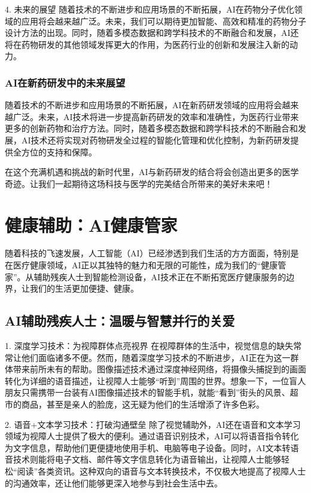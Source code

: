 4. 未来的展望
随着技术的不断进步和应用场景的不断拓展，AI在药物分子优化领域的应用将会越来越广泛。未来，我们可以期待更加智能、高效和精准的药物分子设计方法的出现。同时，随着多模态数据和跨学科技术的不断融合和发展，AI还将在药物研发的其他领域发挥更大的作用，为医药行业的创新和发展注入新的动力。

\subsubsection{AI在新药研发中的未来展望}
随着技术的不断进步和应用场景的不断拓展，AI在新药研发领域的应用将会越来越广泛。未来，AI技术将进一步提高新药研发的效率和准确性，为医药行业带来更多的创新药物和治疗方法。同时，随着多模态数据和跨学科技术的不断融合和发展，AI技术还将实现对药物研发全过程的智能化管理和优化控制，为新药研发提供全方位的支持和保障。

在这个充满机遇和挑战的新时代里，AI与新药研发的结合将会创造出更多的医学奇迹。让我们一起期待这场科技与医学的完美结合所带来的美好未来吧！

\section{健康辅助：AI健康管家}
随着科技的飞速发展，人工智能（AI）已经渗透到我们生活的方方面面，特别是在医疗健康领域，AI正以其独特的魅力和无限的可能性，成为我们的“健康管家”。从辅助残疾人士到智能检测设备，AI技术正在不断拓宽医疗健康服务的边界，让我们的生活更加便捷、健康。
\subsection{AI辅助残疾人士：温暖与智慧并行的关爱}

1. 深度学习技术：为视障群体点亮视界
在视障群体的生活中，视觉信息的缺失常常让他们面临诸多不便。然而，随着深度学习技术的不断进步，AI正在为这一群体带来前所未有的帮助。图像描述技术通过深度神经网络，将摄像头捕捉到的画面转化为详细的语音描述，让视障人士能够“听到”周围的世界。想象一下，一位盲人朋友只需携带一台装有AI图像描述技术的智能手机，就能“看到”街头的风景、超市的商品，甚至是亲人的脸庞，这无疑为他们的生活增添了许多色彩。

2. 语音+文本学习技术：打破沟通壁垒
除了视觉辅助外，AI还在语音和文本学习领域为视障人士提供了极大的便利。通过语音识别技术，AI可以将语音指令转化为文字信息，帮助他们更便捷地使用手机、电脑等电子设备。同时，AI文本转语音技术则能将电子文档、邮件等文字信息转化为语音输出，让视障人士能够轻松“阅读”各类资讯。这种双向的语音与文本转换技术，不仅极大地提高了视障人士的沟通效率，还让他们能够更深入地参与到社会生活中去。

